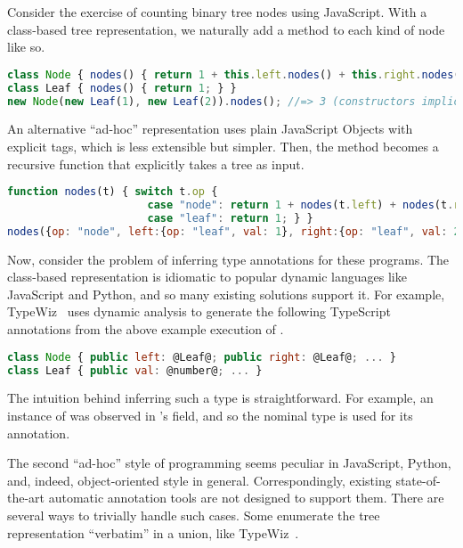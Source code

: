 \label{infer:chapter:intro}

%

Consider the exercise of counting binary tree nodes using JavaScript.
With a class-based tree representation, we naturally add a method
to each kind of node like so.

\begin{lstlisting}[language=JavaScript]
class Node { nodes() { return 1 + this.left.nodes() + this.right.nodes(); } }
class Leaf { nodes() { return 1; } }
new Node(new Leaf(1), new Leaf(2)).nodes(); //=> 3 (constructors implicit)
\end{lstlisting}

An alternative ``ad-hoc'' representation uses plain JavaScript Objects
with explicit tags, which is less extensible but simpler.
Then, the method becomes a recursive function that explicitly takes a tree as input.

\begin{lstlisting}[language=JavaScript]
function nodes(t) { switch t.op { 
                      case "node": return 1 + nodes(t.left) + nodes(t.right);
                      case "leaf": return 1; } }
nodes({op: "node", left:{op: "leaf", val: 1}, right:{op: "leaf", val: 2}})//=>3
\end{lstlisting}

Now, consider the problem of inferring type annotations for these programs.
The class-based representation is idiomatic to popular dynamic languages
like JavaScript and Python, and so many existing solutions support it.
For example, TypeWiz~ uses dynamic analysis to generate
the following TypeScript annotations from the above example execution of .

\begin{lstlisting}[language=JavaScript]
class Node { public left: @Leaf@; public right: @Leaf@; ... }
class Leaf { public val: @number@; ... }
\end{lstlisting}

The intuition behind inferring such a type is straightforward.
For example, an instance of  was observed in 's  field,
and so the nominal type  is used for its annotation.

The second ``ad-hoc'' style of programming seems peculiar in JavaScript, Python, and, indeed,
object-oriented style in general.
Correspondingly, existing state-of-the-art automatic annotation tools are not designed
to support them.
There are several ways to trivially handle such cases.
Some enumerate the tree representation ``verbatim'' in a union, like TypeWiz~.

